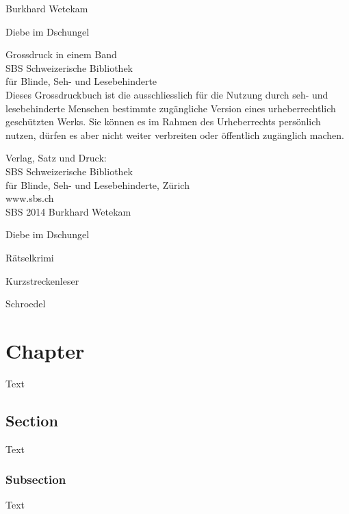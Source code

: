 \documentclass[17pt,a4paper,extrafontsizes,twoside,showtrims,openright]{memoir}
\begin{document}
\raggedright
\frontmatter
{\large Burkhard Wetekam}\\[1.5cm]
\begin{Spacing}{1.75}
{\huge Diebe im Dschungel}\\[0.5cm]
\end{Spacing}
\vfill
Grossdruck in einem Band\\[0.5cm]
SBS Schweizerische Bibliothek \\
für Blinde, Seh- und Lesebehinderte\\[0.5cm]
\clearpage
Dieses Grossdruckbuch ist die ausschliesslich für die Nutzung durch seh- und lesebehinderte Menschen bestimmte zugängliche Version eines urheberrechtlich geschützten Werks. Sie können es im Rahmen des Urheberrechts persönlich nutzen, dürfen es aber nicht weiter verbreiten oder öffentlich zugänglich machen.

\vfill
Verlag, Satz und Druck:\\[0.5cm]
SBS Schweizerische Bibliothek \\
für Blinde, Seh- und Lesebehinderte, Zürich\\[0.5cm]
www.sbs.ch\\[0.5cm]
SBS 2014
\cleartorecto
{\normalsize Burkhard Wetekam}\\[1.5cm]
\begin{Spacing}{1.75}
{\Large Diebe im Dschungel}\\[0.5cm]
\end{Spacing}
Rätselkrimi

Kurzstreckenleser

\vfill
Schroedel

\clearpage
\cleartorecto
\tableofcontents*
\mainmatter
\pagestyle{Ruled}
\chapter[Chapter]{Chapter}
Text

\section[Section]{Section}
Text

\subsection[Subsection]{Subsection}
Text

\chapter*{\ }
\end{document}
